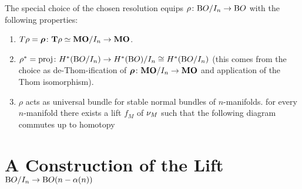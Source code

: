 \begin{Thm*}
  The special choice of the chosen resolution equips
  $\rho\colon\mathrm{B}O/I_{n}\to\mathrm{B}O$ with the following properties:
  \begin{enumerate}
  \item
    $T{\rho} = \bm{\rho}\colon \bm{\mathrm{T}}{\rho}\simeq\bm{\mathrm{MO}}/I_{n}\to\bm{\mathrm{MO}}$.
  \item
    ${\rho}^*=\mathrm{proj}\colon
    H^*(\mathrm{B}O/I_{n}) \to H^*(\mathrm{B}O)/I_{n}\cong H^*(\mathrm{B}O/I_{n})$
    (this comes from the choice as de-Thom-ification of
    $\bm{\rho}\colon\bm{\mathrm{MO}}/I_{n}\to\bm{\mathrm{MO}}$ and application of the Thom
    isomorphism).
  \item
    $\rho$ acts as universal bundle for stable normal bundles of
    $n$-manifolds.
    \Idest for every $n$-manifold there exists a lift $f_M$ of
    $\nu_{M}$ 
    such that the following diagram commutes up to homotopy
    \begin{center}
    \end{center}
  \end{enumerate}
\end{Thm*}


\section*{A Construction of the Lift $\mathrm{B}O/I_{n}\to\mathrm{B}O(n-\alpha(n))$}


